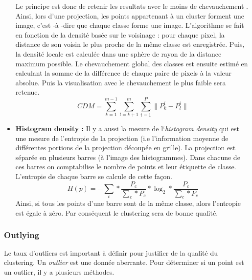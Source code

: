 \begin{itemize}
Le principe est donc de retenir les resultats avec le moins de chevauchement \cite{AndradaTatu2010visual}.
Ainsi, lors d’une projection, les points appartenant à un cluster forment une image, c'est -à
-dire que chaque classe forme une image.
L’algorithme se fait en fonction de la densité basée sur le voisinage : pour chaque pixel, la
distance de son voisin le plus proche de la même classe est enregistrée. Puis, la densité
locale est calculée dans une sphère de rayon de la distance maximum possible.
Le chevauchement global des classes est ensuite estimé en calculant la somme de la
différence de chaque paire de pixels à la valeur absolue. Puis la visualisation avec le
chevauchement le plus faible sera retenue.
\[CDM =  \sum_{k=1}^{m-1} \sum_{l=k+1}^{m} \sum_{i=1}^{P} \lVert P_{k}^{i} - P_{l}^{i} \rVert \]


\item
\textbf{Histogram density : }
\smallskip
Il y a aussi la mesure de l`\textit{histogram density} \cite{HeulotThese} \cite{AndradaTatu2009combining} qui est une mesure de l’entropie de la projection
(i.e l'information moyenne de différentes portions de la projection découpée en grille). La
projection est séparée en plusieurs barres (à l'image des histogrammes). Dans chacune de
ces barres on comptabilise le nombre de points et leur étiquette de classe. L’entropie de
chaque barre se calcule de cette façon. \[ H(p) = - \sum_{c} * \frac{P_c}{\sum_{c}*P_c} * \log_2 * \frac{P_c}{\sum_c * P_c} \]
Ainsi, si tous les points d’une barre sont de la même classe, alors l’entropie est égale à zéro. Par conséquent le clustering sera de bonne qualité.

\end{itemize}
\smallskip



\subsubsection{Outlying}

Le taux d’outliers est important à définir pour justifier de la qualité du clustering.
Un \textit{outlier} est une donnée aberrante. Pour déterminer si un point est un outlier, il y a plusieurs méthodes.

